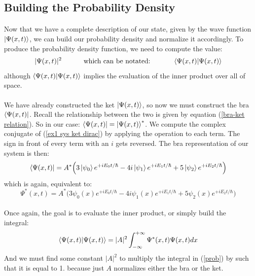 \documentclass[12pt,letterpaper]{book}
\begin{document}

\subsection*{Building the Probability Density}
\paragraph*{}Now that we have a complete description of our state, given by the wave function $\ket{\Psi(x,t)}$, we can build our probability density and normalize it accordingly. To produce the probability density function, we need to compute the value:
\begin{equation}
|\Psi(x,t)|^2 \text{\hspace{1cm} which can be notated: \hspace{1cm}} \braket{\Psi(x,t)}{\Psi(x,t)}
\end{equation}
although $\braket{\Psi(x,t)}{\Psi(x,t)}$ implies the evaluation of the inner product over all of space.
\paragraph*{}We have already constructed the ket $\ket{\Psi(x,t)}$, so now we must construct the bra $\bra{\Psi(x,t)}$. Recall the relationship between the two is given by equation (\ref{bra-ket relation}). So in our case: $\bra{\Psi(x,t)} = \ket{\Psi(x,t)}^*$. We compute the complex conjugate of (\ref{ex1 sys ket dirac}) by applying the operation to each term. The sign in front of every term with an $i$ gets reversed. The bra representation of our system is then:
\begin{equation}
\label{ex1 sys bra dirac}
\bra{\Psi(x,t)} = A^* \Big( 3 \ket{\psi_0}e^{+iE_0t/\hbar} - 4i \ket{\psi_1}e^{+iE_1t/\hbar} + 5 \ket{\psi_2} e^{+iE_2t/\hbar} \Big)
\end{equation}
which is again, equivalent to:
\begin{equation}
\label{ex1 sys non-dirac}
\Psi^*(x,t) = A^* \Big( 3 \psi_0(x)e^{+iE_0t/\hbar} - 4i \psi_1(x)e^{+iE_1t/\hbar} + 5 \psi_2(x) e^{+iE_2t/\hbar} \Big)
\end{equation}
\paragraph*{}Once again, the goal is to evaluate the inner product, or simply build the integral:
\begin{equation}
\label{prob}
\braket{\Psi(x,t)}{\Psi(x,t)} = |A|^2 \int_{-\infty}^{+\infty} \Psi^*(x,t)\Psi(x,t) dx
\end{equation}
And we must find some constant $|A|^2$ to multiply the integral in (\ref{prob}) by such that it is equal to 1. because just $A$ normalizes either the bra or the ket.
\end{document}
